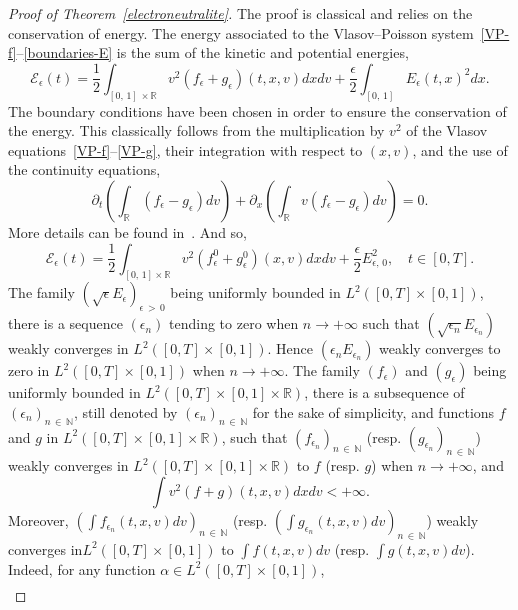 \documentclass[10pt]{amsart}
\theoremstyle{definition}\newtheorem{defi}[theo]{Definition}\newtheorem{rema}[theo]{Remark}\newtheorem{exam}[theo]{Example}\newtheorem{exem}[theo]{Example}\newtheorem{nota}[theo]{Notation}
\newcommand{\R}{\mathbb{R}}
\newcommand{\N}{\mathbb{N}}
\newcommand{\clE}{\mathcal{E}}
\begin{document}
\begin{proof}[{Proof of Theorem~\ref{electroneutralite}}]
The proof is classical and relies on the conservation of energy. The energy associated to the Vlasov--Poisson system~\eqref{VP-f}--\eqref{boundaries-E} is the sum of the kinetic and potential energies,
\begin{equation}\label{energy}
\clE_{\epsilon }(t) = \frac{1}{2} \int_{[0,\,1]\, \times\R } v^2 \left(f_{\epsilon } + g_{\epsilon }\right)(t,x,v) dxdv + \frac{\epsilon }{2} \int_{[0,\,1]} E_{\epsilon}(t,x)^2 dx.
\end{equation}
The boundary conditions have been chosen in order to ensure the conservation of the energy. This classically follows from the multiplication by $v^2$ of the Vlasov equations~\eqref{VP-f}--\eqref{VP-g}, their integration with respect to $(x,v)$, and the use of the continuity equations,
\[
\partial_t \left(\int_{\R } \left(f_{\epsilon } -g_{\epsilon }\right) dv \right) + \partial_x \left(\int_{\R } v \left(f_{\epsilon }-g_{\epsilon }\right) dv \right) = 0.
\]
More details can be found in~\cite{Gio19}. And so,
\[
\clE_{\epsilon }(t) = \frac{1}{2}\int_{[0,\,1] \times \R } v^2 \left(f_{\epsilon }^0 + g_{\epsilon }^0\right)(x,v)dxdv + \frac{\epsilon }{2} E_{\epsilon,\,0}^2,\quad t\in [0,T].
\]
The family $(\sqrt{\epsilon } E_{\epsilon })_{\epsilon\,>\,0}$ being uniformly bounded in $L^2([0,T] \times [0,1])$, there is a sequence $(\epsilon _n)$ tending to zero when $n \to +\infty $ such that $(\sqrt{\epsilon _n} E_{\epsilon _n})$ weakly converges in $L^2([0,T] \times [0,1])$. Hence $(\epsilon _n E_{\epsilon _n})$ weakly converges to zero in $L^2([0,T]\times [0,1])$ when $n \to +\infty $. The family $(f_{\epsilon })$ and $(g_{\epsilon })$ being uniformly bounded in $L^2([0,T] \times [0,1] \times\R)$, there is a subsequence of $(\epsilon _n)_{n\,\in\,\N}$, still denoted by $(\epsilon _n)_{n\,\in\,\N}$ for the sake of simplicity, and functions $f$ and $g$ in $L^2([0,T] \times [0,1] \times \R)$, such that $(f_{\epsilon_n})_{n\,\in\,\N}$ (resp. $(g_{\epsilon _n})_{n\,\in\,\N}$) weakly converges in $L^2([0,T] \times [0,1] \times \R)$ to $f$ (resp. $g$) when $n\rightarrow +\infty $, and
\[
\int v^2(f+g)(t,x,v) dxdv < +\infty.
\]
Moreover, $(\int f_{\epsilon _n}(t,x,v) dv)_{n\, \in\,\N} $ (resp. $(\int g_{\epsilon_n}(t,x,v) dv)_{n\,\in\,\N} $) weakly converges in\linebreak $L^2([0,T]\times [0,1])$ to $\int f(t,x,v) dv$ (resp. $\int g(t,x,v) dv$). Indeed, for any function $\alpha \in L^2([0,T] \times [0,1])$,
\begin{multline}\label{weak-cv-of-rho-n}

\end{multline}
\end{proof}
\end{document}
